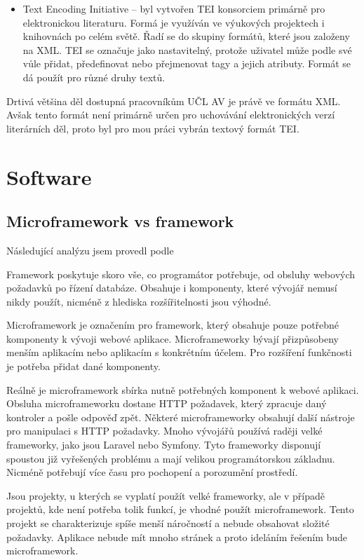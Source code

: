\begin{itemize}
                \item Text Encoding Initiative – byl vytvořen TEI konsorciem primárně pro elektronickou literaturu. Formá je využíván ve výukových projektech i knihovnách po celém světě. Řadí se do skupiny formátů, které jsou založeny na XML. TEI se označuje jako nastavitelný, protože uživatel může podle své vůle přidat, předefinovat nebo přejmenovat tagy a jejich atributy. Formát se dá použít pro různé druhy textů.
            \end{itemize}
            
            Drtivá většina děl dostupná pracovníkům UČL AV je právě ve formátu XML. Avšak tento formát není primárně určen pro uchovávání elektronických verzí literárních děl, proto byl pro mou práci vybrán textový formát TEI.
    \section{Software}
        \subsection{Microframework vs framework}
            Následující analýzu jsem provedl podle \cite{microframework-vs-framework}
            
            Framework poskytuje skoro vše, co programátor potřebuje, od obsluhy webových požadavků po řízení databáze. Obsahuje i komponenty, které vývojář nemusí nikdy použít, nicméně z hlediska rozšířitelnosti jsou výhodné.
            
            Microframework je označením pro framework, který obsahuje pouze potřebné komponenty k vývoji webové aplikace. Microframeworky bývají přizpůsobeny menším aplikacím nebo aplikacím s konkrétním účelem. Pro rozšíření funkčnosti je potřeba přidat dané komponenty.
            
            Reálně je microframework sbírka nutně potřebných komponent k webové aplikaci. Obsluha microframeworku dostane HTTP požadavek, který zpracuje daný kontroler a pošle odpověď zpět. Některé microframeworky obsahují další nástroje pro manipulaci s HTTP požadavky. Mnoho vývojářů používá raději velké frameworky, jako jsou Laravel nebo Symfony. Tyto frameworky disponují spoustou již vyřešených problému a mají velikou programátorskou základnu. Nicméně potřebují více času pro pochopení a porozumění prostředí. 
            
            Jsou projekty, u kterých se vyplatí použít velké frameworky, ale v případě projektů, kde není potřeba tolik funkcí, je vhodné použít microframework. Tento projekt se charakterizuje spíše menší náročností a nebude obsahovat složité požadavky. Aplikace nebude mít mnoho stránek a proto ideláním řešením bude microframework.
            
